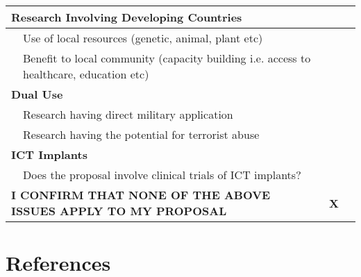 \documentclass[a4paper,11pt,twoside]{scrreprt}
\begin{document}
\begin{small}
\begin{tabular}{|p{1em}p{11cm}|l|l|}
  \multicolumn{2}{|l|}{\bf{Research Involving Developing Countries}} & & \\\hline 
  & Use of local resources (genetic, animal, plant etc) & & \\\hline 
  & Benefit to local community (capacity building 
         i.e. access to healthcare, education etc) & & \\\hline 
  \multicolumn{2}{|l|}{\bf{Dual Use}} & & \\\hline 
  & Research having direct military application  & & \\\hline 
  & Research having the potential for terrorist abuse & & \\\hline 
  \multicolumn{2}{|l|}{\bf{ICT Implants}} & & \\\hline 
  & Does the proposal involve clinical trials of ICT implants?  & & \\\hline 
  \multicolumn{2}{|l|}{\bf\footnotesize{I CONFIRM THAT NONE OF THE ABOVE ISSUES APPLY TO MY PROPOSAL}} 
      &  \textbf{X} &\\\hline 
\end{tabular}
\end{small}

\appendix 
\chapter{References}

\begin{footnotesize}
  
  
\end{footnotesize}
\end{document}
